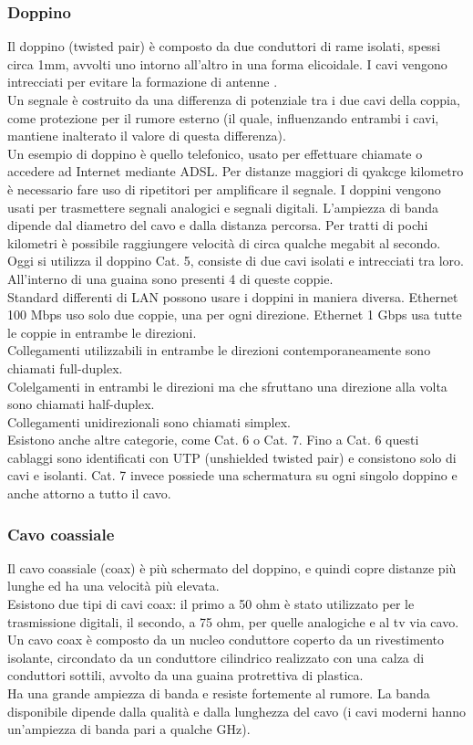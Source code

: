 \documentclass{article}
\begin{document}
		\subsubsection{Doppino}
		Il doppino (twisted pair) è composto da due conduttori di rame isolati, spessi circa 1mm, avvolti uno intorno all'altro in una forma elicoidale. I cavi vengono intrecciati per evitare la formazione di antenne .\\
		Un segnale è costruito da una differenza di potenziale tra i due cavi della coppia, come protezione per il rumore esterno (il quale, influenzando entrambi i cavi, mantiene inalterato il valore di questa differenza).\\
		Un esempio di doppino è quello telefonico, usato per effettuare chiamate o accedere ad Internet mediante ADSL. Per distanze maggiori di qyakcge kilometro è necessario fare uso di ripetitori per amplificare il segnale.
		I doppini vengono usati per trasmettere segnali analogici e segnali digitali.
		L'ampiezza di banda dipende dal diametro del cavo e dalla distanza percorsa. Per tratti di pochi kilometri è possibile raggiungere velocità di circa qualche megabit al secondo.
		Oggi si utilizza il doppino Cat. 5, consiste di due cavi isolati e intrecciati tra loro. All'interno di una guaina sono presenti 4 di queste coppie.\\
		Standard differenti di LAN possono usare i doppini in maniera diversa. Ethernet 100 Mbps uso solo due coppie, una per ogni direzione. Ethernet 1 Gbps usa tutte le coppie in entrambe le direzioni.\\
		Collegamenti utilizzabili in entrambe le direzioni contemporaneamente sono chiamati full-duplex. \\
		Colelgamenti in entrambi le direzioni ma che sfruttano una direzione alla volta sono chiamati half-duplex.\\
		Collegamenti unidirezionali sono chiamati simplex.\\
		Esistono anche altre categorie, come Cat. 6 o Cat. 7. Fino a Cat. 6 questi cablaggi sono identificati con UTP (unshielded twisted pair) e consistono solo di cavi e isolanti. Cat. 7 invece possiede una schermatura su ogni singolo doppino e anche attorno a tutto il cavo.
		\subsubsection{Cavo coassiale}
		Il cavo coassiale (coax) è più schermato del doppino, e quindi copre distanze più lunghe ed ha una velocità più elevata. \\
		Esistono due tipi di cavi coax: il primo a 50 ohm è stato utilizzato per le trasmissione digitali, il secondo, a 75 ohm, per quelle analogiche e al tv via cavo.\\
		Un cavo coax è composto da un nucleo conduttore coperto da un rivestimento isolante, circondato da un conduttore cilindrico realizzato con una calza di conduttori sottili, avvolto da una guaina protrettiva di plastica.\\
		Ha una grande ampiezza di banda e resiste fortemente al rumore. La banda disponibile dipende dalla qualità e dalla lunghezza del cavo (i cavi moderni hanno un'ampiezza di banda pari a qualche GHz).
\end{document}
